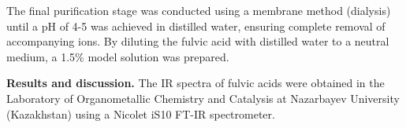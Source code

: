 
The final purification stage was conducted using a membrane method
(dialysis) until a pH of 4-5 was achieved in distilled water, ensuring
complete removal of accompanying ions. By diluting the fulvic acid with
distilled water to a neutral medium, a 1.5\% model solution was
prepared.

{\bfseries Results and discussion.} The IR spectra of fulvic acids were
obtained in the Laboratory of Organometallic Chemistry and Catalysis at
Nazarbayev University (Kazakhstan) using a Nicolet iS10 FT-IR
spectrometer.

